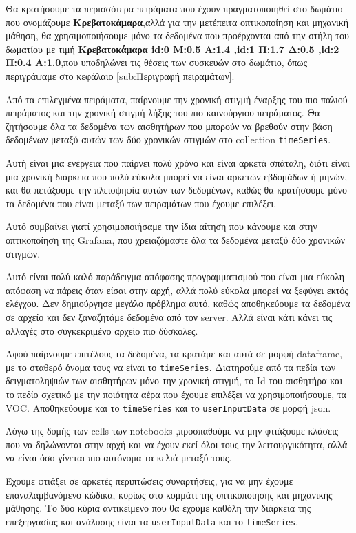 Θα κρατήσουμε τα περισσότερα πειράματα που έχουν πραγματοποιηθεί στο δωμάτιο
που ονομάζουμε \textbf{Κρεβατοκάμαρα},αλλά για την μετέπειτα οπτικοποίηση και μηχανική μάθηση,
θα χρησιμοποιήσουμε μόνο τα δεδομένα που προέρχονται από την στήλη του δωματίου με τιμή
\textbf{Κρεβατοκάμαρα id:0 Μ:0.5 Α:1.4 ,id:1 Π:1.7 Δ:0.5  ,id:2 Π:0.4 Α:1.0},που υποδηλώνει τις θέσεις των 
συσκευών στο δωμάτιο, όπως περιγράψαμε στο κεφάλαιο \autoref{sub:Περιγραφή πειραμάτων}.

Από τα επιλεγμένα πειράματα, παίρνουμε την χρονική στιγμή έναρξης του πιο παλιού πειράματος
και την χρονική στιγμή λήξης του πιο καινούργιου πειράματος.
Θα ζητήσουμε όλα τα δεδομένα των
αισθητήρων που μπορούν να βρεθούν στην βάση δεδομένων μεταξύ αυτών των δύο χρονικών στιγμών στο collection \texttt{timeSeries}.

Αυτή είναι μια ενέργεια που παίρνει πολύ χρόνο και είναι αρκετά σπάταλη,  διότι είναι μια χρονική διάρκεια που 
πολύ εύκολα μπορεί να είναι αρκετών εβδομάδων ή μηνών, και θα πετάξουμε την πλειοψηφία αυτών των δεδομένων,
καθώς θα κρατήσουμε μόνο τα δεδομένα που είναι μεταξύ των πειραμάτων που έχουμε επιλέξει.

Αυτό συμβαίνει γιατί χρησιμοποιήσαμε την ίδια αίτηση που κάνουμε και στην οπτικοποίηση της Grafana,
που χρειαζόμαστε όλα τα δεδομένα μεταξύ δύο χρονικών στιγμών.

Αυτό είναι πολύ καλό παράδειγμα απόφασης προγραμματισμού που είναι μια εύκολη απόφαση να πάρεις όταν είσαι στην αρχή,
αλλά πολύ εύκολα μπορεί να ξεφύγει εκτός ελέγχου.
Δεν δημιούργησε μεγάλο πρόβλημα αυτό, καθώς αποθηκεύουμε τα δεδομένα σε αρχείο και δεν ξαναζητάμε δεδομένα από τον server.
Αλλά είναι κάτι κάνει τις αλλαγές στο συγκεκριμένο αρχείο πιο δύσκολες.

Αφού παίρνουμε επιτέλους τα δεδομένα, τα κρατάμε και αυτά σε μορφή dataframe, με το σταθερό όνομα τους 
να είναι το \texttt{timeSeries}.
Διατηρούμε από τα πεδία των δειγματοληψιών των αισθητήρων μόνο την χρονική στιγμή,
το Id του αισθητήρα και το πεδίο σχετικό με την ποιότητα αέρα που έχουμε επιλέξει να χρησιμοποιήσουμε, τα VOC.
Αποθηκεύουμε και το \texttt{timeSeries} και το \texttt{userInputData} σε μορφή json.

Λόγω της δομής των cells των notebooks ,προσπαθούμε να μην φτιάξουμε κλάσεις που να δηλώνονται στην αρχή και να έχουν 
εκεί όλοι τους την λειτουργικότητα, αλλά να είναι όσο γίνεται πιο αυτόνομα τα κελιά μεταξύ τους.

Έχουμε φτιάξει σε αρκετές περιπτώσεις συναρτήσεις, για να μην έχουμε επαναλαμβανόμενο κώδικα,
κυρίως στο κομμάτι της οπτικοποίησης και μηχανικής μάθησης.
Το δύο κύρια αντικείμενο που θα έχουμε καθόλη την διάρκεια της επεξεργασίας και ανάλυσης είναι τα
\texttt{userInputData} και το \texttt{timeSeries}.

